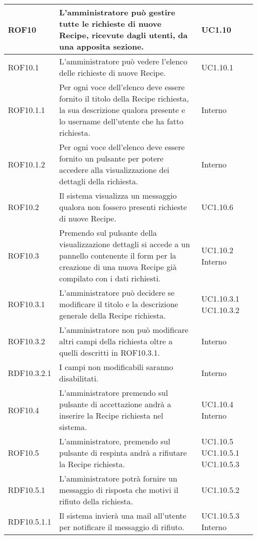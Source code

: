 \begin{center}
\begin{longtable}{| p{2.5cm} | p{8cm} | p{2cm} |}
		ROF10  &  L'amministratore può gestire tutte le richieste di nuove Recipe, ricevute dagli utenti, da una apposita sezione.  & UC1.10 \\
		\hline
		ROF10.1  &  L'amministratore può vedere l'elenco delle richieste di nuove Recipe.  & UC1.10.1 \\
		\hline
		ROF10.1.1  &  Per ogni voce dell'elenco deve essere fornito il titolo della Recipe richiesta, la sua descrizione qualora presente e lo username dell'utente che ha fatto richiesta.  & Interno \\
		\hline
		ROF10.1.2  &  Per ogni voce dell'elenco deve essere fornito un pulsante per potere accedere alla visualizzazione dei dettagli della richiesta.  & Interno \\
		\hline
		ROF10.2  &  Il sistema visualizza un messaggio qualora non fossero presenti richieste di nuove Recipe.  & UC1.10.6 \\
		\hline
		ROF10.3  &  Premendo sul pulsante della visualizzazione dettagli si accede a un pannello contenente il form per la creazione di una nuova Recipe già compilato con i dati richiesti.  &  UC1.10.2 \newline Interno \\
		\hline
		ROF10.3.1  &  L'amministratore può decidere se modificare il titolo e la descrizione generale della Recipe richiesta.  & UC1.10.3.1 \newline UC1.10.3.2 \\
		\hline
		ROF10.3.2  &  L'amministratore non può modificare altri campi della richiesta oltre a quelli descritti in ROF10.3.1.  & Interno \\
		\hline
		RDF10.3.2.1  &  I campi non modificabili saranno disabilitati.  & Interno \\
		\hline
		ROF10.4  &  L'amministratore premendo sul pulsante di accettazione andrà a inserire la Recipe richiesta nel sistema.  & UC1.10.4 \newline Interno \\
		\hline
		ROF10.5  &  L'amministratore, premendo sul pulsante di respinta andrà a rifiutare la Recipe richiesta.  & UC1.10.5 \newline UC1.10.5.1 \newline UC1.10.5.3 \\
		\hline
		RDF10.5.1  &  L'amministratore potrà fornire un messaggio di risposta che motivi il rifiuto della richiesta.  & UC1.10.5.2 \\
		\hline
		RDF10.5.1.1  &  Il sistema invierà una mail all'utente per notificare il messaggio di rifiuto.  & UC1.10.5.3 \newline Interno \\
		\hline





\end{longtable}
\end{center}
